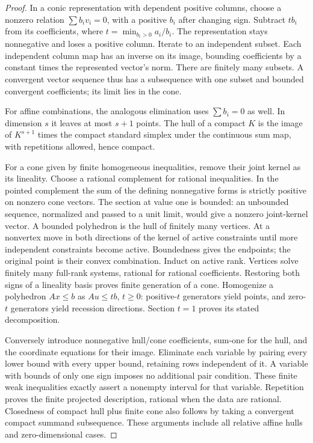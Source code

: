 \documentclass[11pt]{article}
\begin{document}
\begin{proof}
In a conic representation with dependent positive columns, choose a nonzero relation $\sum b_i v_i=0$, with a positive $b_i$ after changing sign. Subtract $t b_i$ from its coefficients, where $t=\min_{b_i>0}a_i/b_i$. The representation stays nonnegative and loses a positive column. Iterate to an independent subset. Each independent column map has an inverse on its image, bounding coefficients by a constant times the represented vector's norm. There are finitely many subsets. A convergent vector sequence thus has a subsequence with one subset and bounded convergent coefficients; its limit lies in the cone.

For affine combinations, the analogous elimination uses $\sum b_i=0$ as well. In dimension $s$ it leaves at most $s+1$ points. The hull of a compact $K$ is the image of $K^{s+1}$ times the compact standard simplex under the continuous sum map, with repetitions allowed, hence compact.

For a cone given by finite homogeneous inequalities, remove their joint kernel as its lineality. Choose a rational complement for rational inequalities. In the pointed complement the sum of the defining nonnegative forms is strictly positive on nonzero cone vectors. The section at value one is bounded: an unbounded sequence, normalized and passed to a unit limit, would give a nonzero joint-kernel vector. A bounded polyhedron is the hull of finitely many vertices. At a nonvertex move in both directions of the kernel of active constraints until more independent constraints become active. Boundedness gives the endpoints; the original point is their convex combination. Induct on active rank. Vertices solve finitely many full-rank systems, rational for rational coefficients. Restoring both signs of a lineality basis proves finite generation of a cone. Homogenize a polyhedron $Ax\leq b$ as $Au\leq tb$, $t\geq0$: positive-$t$ generators yield points, and zero-$t$ generators yield recession directions. Section $t=1$ proves its stated decomposition.

Conversely introduce nonnegative hull/cone coefficients, sum-one for the hull, and the coordinate equations for their image. Eliminate each variable by pairing every lower bound with every upper bound, retaining rows independent of it. A variable with bounds of only one sign imposes no additional pair condition. These finite weak inequalities exactly assert a nonempty interval for that variable. Repetition proves the finite projected description, rational when the data are rational. Closedness of compact hull plus finite cone also follows by taking a convergent compact summand subsequence. These arguments include all relative affine hulls and zero-dimensional cases.
\end{proof}
\end{document}
